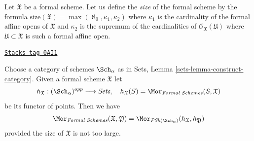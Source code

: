 \medskip\noindent
Let $\mathfrak X$ be a formal scheme. Let us define the {\it size}
of the formal scheme by the formula
$\text{size}(\mathfrak X) = \max(\aleph_0, \kappa_1, \kappa_2)$
where $\kappa_1$ is the cardinality of the formal affine opens of
$\mathfrak X$ and $\kappa_2$ is the supremum of the cardinalities
of $\mathcal{O}_\mathfrak X(\mathfrak U)$ where
$\mathfrak U \subset \mathfrak X$ is such a formal affine open.

\begin{lemma}
\label{formal-spaces-lemma-fully-faithful}
\href{https://stacks.math.columbia.edu/tag/0AI1}{\texttt{Stacks tag 0AI1}}

Choose a category of schemes $\Sch_\alpha$
as in Sets, Lemma \ref{sets-lemma-construct-category}.
Given a formal scheme $\mathfrak X$ let
$$
h_\mathfrak X : (\Sch_\alpha)^{opp} \longrightarrow \textit{Sets},\quad
h_\mathfrak X(S) = \Mor_{\textit{Formal Schemes}}(S, \mathfrak X)
$$
be its functor of points. Then we have
$$
\Mor_{\textit{Formal Schemes}}(\mathfrak X, \mathfrak Y) =
\Mor_{\textit{PSh}(\Sch_\alpha)}(h_\mathfrak X, h_\mathfrak Y)
$$
provided the size of $\mathfrak X$ is not too large.
\end{lemma}

